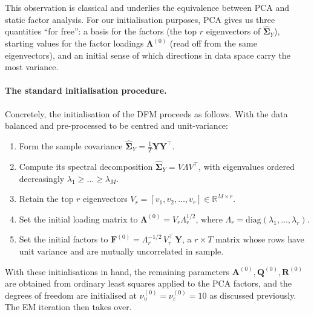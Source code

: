 \documentclass[11pt, a4paper, oneside]{article}
\newcommand{\mY}{\mathbf{Y}}
\newcommand{\mF}{\mathbf{F}}
\newcommand{\mL}{\boldsymbol{\Lambda}}
\newcommand{\mA}{\mathbf{A}}
\newcommand{\mR}{\mathbf{R}}
\newcommand{\mQ}{\mathbf{Q}}
\begin{document}
This observation is classical and underlies the equivalence between
PCA and static factor analysis. For our initialisation purposes, PCA
gives us three quantities ``for free'': a basis for the factors (the
top $r$ eigenvectors of
$\widehat{\boldsymbol{\Sigma}}_Y$), starting values for the factor
loadings $\mL^{(0)}$ (read off from the same eigenvectors), and an
initial sense of which directions in data space carry the most
variance.

\paragraph{The standard initialisation procedure.}
Concretely, the initialisation of the DFM proceeds as follows. With
the data balanced
and pre-processed to be centred and unit-variance:
\begin{enumerate}[leftmargin=1.5em, itemsep=3pt]
    \item Form the sample covariance
          $\widehat{\boldsymbol{\Sigma}}_Y = \frac{1}{T} \mY \mY^{\top}$.
    \item Compute its spectral decomposition
          $\widehat{\boldsymbol{\Sigma}}_Y = V \Lambda V^{\top}$,
          with eigenvalues ordered decreasingly
          $\lambda_1 \geq \ldots \geq \lambda_M$.
    \item Retain the top $r$ eigenvectors
          $V_r = [v_1, v_2, \ldots, v_r] \in \mathbb{R}^{M \times r}$.
    \item Set the initial loading matrix to
          $\mL^{(0)} = V_r \Lambda_r^{1/2}$, where
          $\Lambda_r = \mathrm{diag}(\lambda_1, \ldots, \lambda_r)$.
    \item Set the initial factors to
          $\mF^{(0)} = \Lambda_r^{-1/2}\, V_r^{\top}\, \mY$, a
          $r \times T$ matrix whose rows have unit variance and are
          mutually uncorrelated in sample.
\end{enumerate}
With these initialisations in hand, the remaining parameters
$\mA^{(0)}, \mQ^{(0)}, \mR^{(0)}$ are obtained from ordinary least
squares applied to the PCA factors, and the degrees of freedom are
initialised at $\nu_u^{(0)} = \nu_\varepsilon^{(0)} = 10$ as discussed previously. The EM iteration then
takes over.
\end{document}
